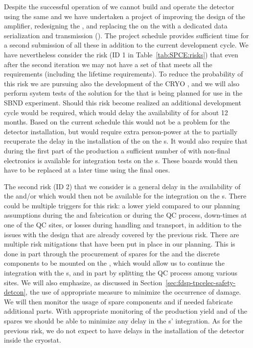 Despite the successful operation of  we cannot build and operate
the   detector using the same  and we have
undertaken a project of improving the design of the  amplifier, redesigning
the , and replacing the  on the  with a dedicated data
serialization and transmission  (). The project schedule provides
sufficient time for a second submission of all these  in addition
to the current development cycle. We have nevertheless consider the risk (ID 1
in Table~\ref{tab:SPCE:risks}) that even after the second iteration 
we may not have a set of  that meets all the  requirements
(including the lifetime requirements). To reduce the probability of this 
risk we are pursuing also the development of the CRYO , and we
will also perform system tests of the  solution for the  that is being
planned for use in the SBND experiment. Should this risk become realized an
additional development cycle would be required, which would delay the availability
of  for about 12 months. Based on the current schedule this would
not be a problem for the detector installation, but would require extra 
person-power at the  to partially recuperate the delay in the
installation of the  on the s. It would also require
that during the first part of the  production a sufficient number
of  with non-final electronics is available for integration tests
on the s. These boards would then have to be replaced at a later
time using the final ones.

The second risk (ID 2) that we consider is a general delay in the availability of the 
and/or  which would then not be available for the integration
on the s. There could be multiple triggers for this risk: a lower yield 
compared to our planning assumptions during the  and  
fabrication or during the QC process, down-times at one of the QC sites, or losses during 
handling and transport, in addition to the issues with the design that are already 
covered by the previous risk. There are multiple risk mitigations that have been
put in place in our planning. This is done in part through the procurement of
spares for the  and the discrete components to be mounted on the
, which would allow us to continue the integration with the s,
and in part by splitting the QC process among various sites. We will also emphasize,
as discussed in Section~\ref{sec:fdsp-tpcelec-safety-detcon}, the use of appropriate
measure to minimize the occurrence of  damage. We will then monitor the usage
of spare components and if needed fabricate additional parts. With appropriate
monitoring of the production yield and of the spares we should be able to minimize
any delay in the s' integration. As for the previous risk, we
do not expect to have delays in the installation of the detector inside the cryostat.
 
